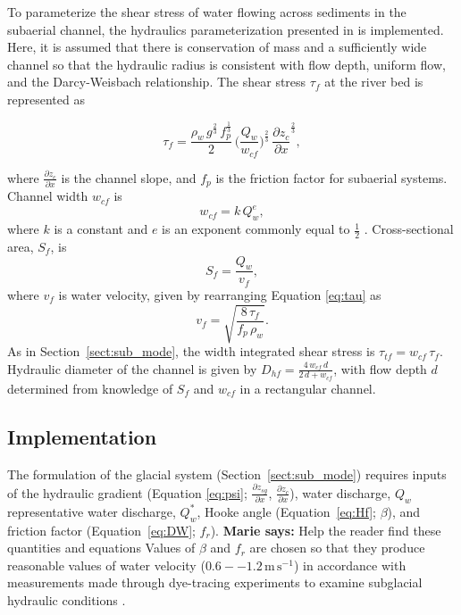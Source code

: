\documentclass[11pt]{article}
\newcommand{\marie}[1]{{\textbf{\color{green}Marie says:} \color{green} #1} }
\newcommand{\unit}[1]{$\mathrm{#1}$}
\begin{document}
\begin{spacing}{1}
 To parameterize the shear stress of water flowing across sediments in the subaerial channel,  the hydraulics parameterization presented in \citet{tucker1997} is implemented.
  Here, it is assumed that there is conservation of mass and a sufficiently wide channel so that the hydraulic radius is consistent with flow depth, uniform flow, and the Darcy-Weisbach relationship.
  The shear stress $\tau_f$ at the river bed is represented as
  \begin{linenomath*}
    \begin{equation}
      \label{eq:DW_tau}
      \tau_f=\frac{\rho_w\,g^{\frac{2}{3}}\,f_p^{\frac{1}{3}}}{2}\, \Big(\frac{Q_w}{w_{cf}} \Big)^{\frac{2}{3}} \,\frac{\partial z_c}{\partial x}^{\frac{2}{3}},
    \end{equation}
  \end{linenomath*}
  where $\frac{\partial z_c}{\partial x}$ is the channel slope, and $f_p$ is the friction factor for subaerial systems.
  Channel width $w_{cf}$ is 
  \begin{equation}
    \label{eq:wcf}
    w_{cf} = k \, Q_w^e,
  \end{equation}
  where $k$ is a constant and $e$ is an exponent commonly equal to $\frac{1}{2}$ \citep{leopold1953}.
  Cross-sectional area, $ S_f$, is 
  \begin{equation}
    \label{eq:Sf}
    S_f = \frac{Q_w}{v_f},
  \end{equation}
  where $v_f$ is water velocity, given by rearranging Equation \ref{eq:tau} as
 \begin{equation}
    \label{eq:vf}
    v_f = \sqrt{\frac{8\,\tau_f}{f_p\,\rho_w}}.
  \end{equation}
  As in Section~\ref{sect:sub_mode}, the width integrated shear stress is $\tau_{tf}=w_{cf}\,\tau_f$.
  Hydraulic diameter of the channel is given by $D_{hf} = \frac{4\,w_{cf}\,d}{2\,d+w_{cf}}$, with flow depth $d$ determined from knowledge of $S_f$ and $w_{cf}$ in a rectangular channel.
  
  \subsection{Implementation}
  
The formulation of the glacial system (Section~\ref{sect:sub_mode}) requires inputs of the hydraulic gradient (Equation \ref{eq:psi}; $\frac{\partial z_{sg}}{\partial x}$, $\frac{\partial z_{c}}{\partial x}$), water discharge, $Q_w$ representative water discharge, $Q_w^*$,  Hooke angle (Equation~\ref{eq:Hf}; $\beta$), and friction factor (Equation~\ref{eq:DW}; $f_r$). \marie{Help the reader find these quantities and equations}
  Values of $\beta$ and $f_r$ are chosen so that they produce reasonable values of water velocity ($0.6-- 1.2$\,\unit{m}\,\unit{s}$^{-1}$) in accordance with measurements made through dye-tracing experiments to examine subglacial hydraulic conditions \citep[Section~\ref{sect:sub_mode}, Figure~\ref{fig:model_outs}; e.g.][]{werder2010}.
  

\end{spacing}
\end{document}

